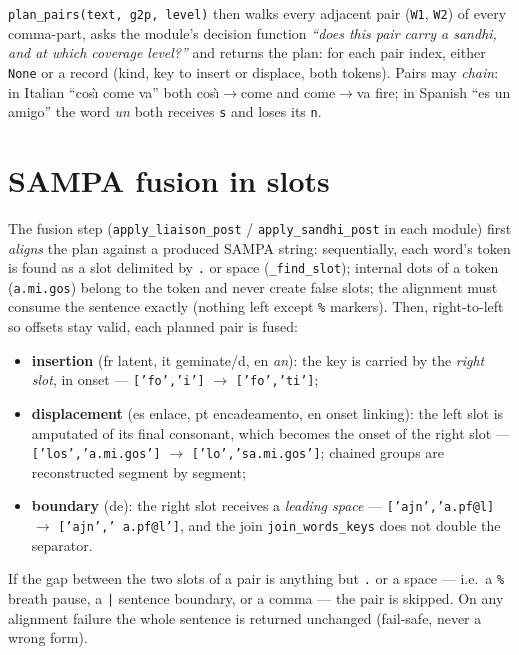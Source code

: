 \documentclass[11pt,a4paper]{report}
\newcommand{\smp}[1]{\texttt{#1}}          %
\begin{document}
\smp{plan\_pairs(text, g2p, level)} then walks every adjacent pair
(\smp{W1}, \smp{W2}) of every comma-part, asks the module's decision
function \emph{``does this pair carry a sandhi, and at which coverage
level?''} and returns the plan: for each pair index, either \smp{None} or a
record (kind, key to insert or displace, both tokens). Pairs may
\emph{chain}: in Italian ``cos\`{\i} come va'' both
cos\`{\i}$\rightarrow$come and come$\rightarrow$va fire; in Spanish
``es un amigo'' the word \emph{un} both receives \smp{s} and loses its
\smp{n}.

\section{SAMPA fusion in slots}

The fusion step (\smp{apply\_liaison\_post} / \smp{apply\_sandhi\_post} in
each module) first \emph{aligns} the plan against a produced SAMPA string:
sequentially, each word's token is found as a slot delimited by \smp{.} or
space (\smp{\_find\_slot}); internal dots of a token (\smp{a.mi.gos}) belong
to the token and never create false slots; the alignment must consume the
sentence exactly (nothing left except \smp{\%} markers). Then, right-to-left
so offsets stay valid, each planned pair is fused:

\begin{itemize}
  \item \textbf{insertion} (fr latent, it geminate/d, en \emph{an}): the key
        is carried by the \emph{right slot}, in onset —
        \smp{['fo','i']} $\rightarrow$ \smp{['fo','ti']};
  \item \textbf{displacement} (es enlace, pt encadeamento, en onset linking):
        the left slot is amputated of its final consonant, which becomes the
        onset of the right slot — \smp{['los','a.mi.gos']}
        $\rightarrow$ \smp{['lo','sa.mi.gos']}; chained groups are
        reconstructed segment by segment;
  \item \textbf{boundary} (de): the right slot receives a \emph{leading
        space} — \smp{['ajn','a.pf@l]} $\rightarrow$
        \smp{['ajn',' a.pf@l']}, and the join
        \smp{join\_words\_keys} does not double the separator.
\end{itemize}

If the gap between the two slots of a pair is anything but \smp{.} or a
space — i.e.\ a \smp{\%} breath pause, a \smp{|} sentence boundary, or a
comma — the pair is skipped. On any alignment failure the whole sentence is
returned unchanged (fail-safe, never a wrong form).
\end{document}
